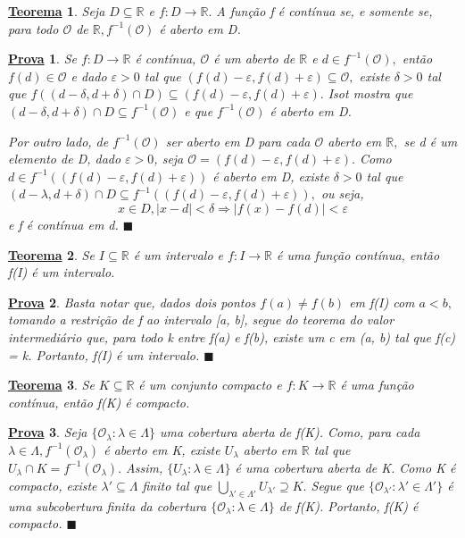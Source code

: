 \documentclass{article}
\newtheorem*{theorem*}{\underline{Teorema}}
\newtheorem*{proof*}{\underline{Prova}}
\renewcommand\qedsymbol{$\blacksquare$}
\begin{document}
 \begin{theorem*}
   Seja $D\subseteq{\mathbb{R}}$ e $f:D\rightarrow \mathbb{R}.$ A função f é contínua se, e somente se, para todo
   $\mathcal{O}$ de $\mathbb{R}, f^{-1}(\mathcal{O})$ é aberto em D.
 \end{theorem*}
 \begin{proof*}
   Se $f:D\rightarrow \mathbb{R}$ é contínua, $\mathcal{O}$ é um aberto de $\mathbb{R}$ e $d\in f^{-1}(\mathcal{O}),$
   então $f(d)\in \mathcal{O}$ e dado $\varepsilon  > 0$ tal que $(f(d)-\varepsilon , f(d)+\varepsilon )\subseteq{\mathcal{O}},$
   existe $\delta >0$ tal que $f((d-\delta , d+\delta )\cap D)\subseteq{(f(d)-\varepsilon , f(d)+\varepsilon ).}$ Isot mostra que
   $(d-\delta , d+\delta )\cap D\subseteq{f^{-1}(\mathcal{O})}$ e que $f^{-1}(\mathcal{O})$ é aberto em D.

   Por outro lado, de $f^{-1}(\mathcal{O})$ ser aberto em D para cada $\mathcal{O}$ aberto em $\mathbb{R},$ se d é um elemento
   de D, dado $\varepsilon  > 0$, seja $\mathcal{O} = (f(d)-\varepsilon , f(d)+\varepsilon ).$ Como $d\in f^{-1}((f(d)-\varepsilon , f(d)+\varepsilon ))$
   é aberto em D, existe $\delta >0$ tal que $(d-\lambda , d+\delta )\cap D\subseteq{f^{-1}((f(d)-\varepsilon , f(d)+\varepsilon ))},$
   ou seja, 
     $$
       x\in D, |x-d| < \delta \Rightarrow |f(x)-f(d)| < \varepsilon 
     $$
    e f é contínua em d. \qedsymbol
 \end{proof*}
 \begin{theorem*}
   Se $I\subseteq{\mathbb{R}}$ é um intervalo e $f:I\rightarrow \mathbb{R}$ é uma função contínua, então f(I) é um intervalo.
 \end{theorem*}
\begin{proof*}
  Basta notar que, dados dois pontos $f(a)\neq f(b)$ em f(I) com $a < b,$ tomando a restrição de f ao intervalo [a, b],
  segue do teorema do valor intermediário que, para todo k entre f(a) e f(b), existe um c em (a, b) tal que f(c) = k. Portanto,
  f(I) é um intervalo. \qedsymbol
\end{proof*}
\begin{theorem*}
  Se $K\subseteq{\mathbb{R}}$ é um conjunto compacto e $f:K\rightarrow \mathbb{R}$ é uma função contínua, então f(K) é compacto.
\end{theorem*}
\begin{proof*}
  Seja $\{\mathcal{O}_{\lambda }:\lambda \in\Lambda \}$ uma cobertura aberta de f(K). Como, para cada $\lambda \in \Lambda, f^{-1}(\mathcal{O}_{\lambda })$ 
  é aberto em K, existe $U_{\lambda }$ aberto em $\mathbb{R}$ tal que $U_{\lambda }\cap K = f^{-1}(\mathcal{O}_{\lambda }).$
  Assim, $\{U_{\lambda }:\lambda \in\Lambda \}$ é uma cobertura aberta de K. Como K é compacto, existe $\lambda '\subseteq{\Lambda }$
  finito tal que $\bigcup_{\lambda '\in\Lambda '}^{}{U_{\lambda '}}\supseteq{K}.$ Segue que $\{\mathcal{O}_{\lambda '}: \lambda '\in\Lambda '\}$
  é uma subcobertura finita da cobertura $\{\mathcal{O}_{\lambda }:\lambda \in \Lambda \}$ de f(K). Portanto, f(K) é compacto. \qedsymbol
\end{proof*}
\end{document}
